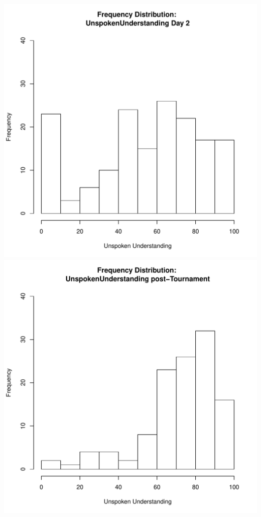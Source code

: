 \documentclass[12pt]{report}
\begin{document}
\includegraphics[scale =.4]{../images/distUnspokenUnderstandingDay2.pdf}
\includegraphics[scale =.4]{../images/distUnspokenUnderstandingPost.pdf}
\end{document}
